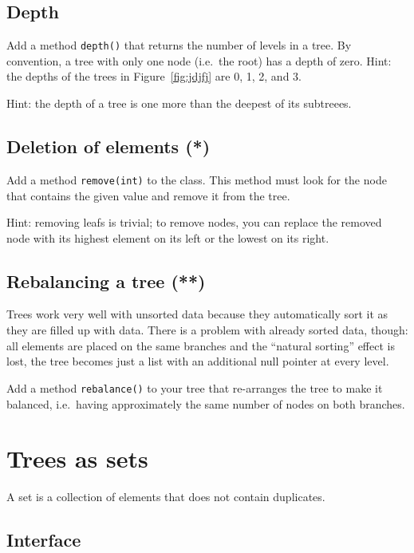 \documentclass{article}
\begin{document}
\subsection{Depth}
\label{sec:depth}

Add a method \verb+depth()+ that returns the number of levels in a
tree. By convention, a tree with only one node (i.e.~the root) has a
depth of zero. Hint: the depths of the trees in Figure~\ref{fig:jdjfj}
are 0, 1, 2, and 3. 

Hint: the depth of a tree is one more than the deepest of its
subtreees. 

\subsection{Deletion of elements (*)}
\label{sec:deletion-elements}

Add a method \verb+remove(int)+ to the class. This method must look
for the node that contains the given value and remove it from the
tree. 

Hint: removing leafs is trivial; to remove nodes, you can replace the
removed node with its highest element on its left or the lowest on its
right. 

\subsection{Rebalancing a tree (**)}
\label{sec:rebalancing-tree-}

Trees work very well with unsorted data because they automatically
sort it as they are filled up with data. There is a problem with
already sorted data, though: all elements are placed on the same
branches and the ``natural sorting'' effect is lost, the tree becomes
just a list with an additional null pointer at every level. 

Add a method \verb+rebalance()+ to your tree that re-arranges the tree
to make it balanced, i.e.~having approximately the same number of
nodes on both branches. 


\section{Trees as sets}
\label{sec:trees-as-sets}

A set is a collection of elements that does not contain duplicates. 

\subsection{Interface}
\label{sec:interface1}
\end{document}
